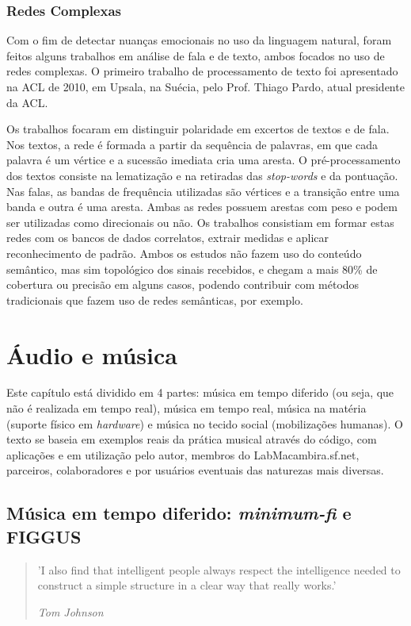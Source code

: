 \subsubsection{Redes Complexas}
Com o fim de detectar nuanças emocionais no uso da linguagem natural, foram feitos alguns trabalhos em análise de fala e de texto, ambos focados no uso de redes complexas. O primeiro trabalho de processamento de texto foi apresentado na ACL de 2010, em Upsala, na Suécia, pelo Prof. Thiago Pardo, atual presidente da ACL.\cite{FabbriACL,FabbriComplenetVoz,FabbriComplenetTexto}

Os trabalhos focaram em distinguir polaridade em excertos de textos e de fala. Nos textos, a rede é formada a partir da sequência de palavras, em que cada palavra é um vértice e a sucessão imediata cria uma aresta. O pré-processamento dos textos consiste na lematização e na retiradas das \emph{stop-words} e da pontuação. Nas falas, as bandas de frequência utilizadas são vértices e a transição entre uma banda e outra é uma aresta. Ambas as redes possuem arestas com peso e podem ser utilizadas como direcionais ou não. Os trabalhos consistiam em formar estas redes com os bancos de dados correlatos, extrair medidas e aplicar reconhecimento de padrão. Ambos os estudos não fazem uso do conteúdo semântico, mas sim topológico dos sinais recebidos, e chegam a mais 80\% de cobertura ou precisão em alguns casos, podendo contribuir com métodos tradicionais que fazem uso de redes semânticas, por exemplo.

\section{Áudio e música}

Este capítulo está dividido em 4 partes: música em
tempo diferido (ou seja, que não é realizada em tempo real), música em
tempo real, música na matéria (suporte físico em \emph{hardware}) e música no
tecido social (mobilizações humanas).
O texto se baseia em exemplos reais da prática musical através do código, com aplicações e em utilização pelo autor, membros do
LabMacambira.sf.net, parceiros, colaboradores e por usuários
eventuais das naturezas mais diversas.


\subsection{Música em tempo diferido: \emph{minimum-fi} e FIGGUS}

\begin{quotation}
\small 'I also find that intelligent people always respect the intelligence needed to construct a simple structure in a clear way that really works.'

\emph{Tom Johnson}
\end{quotation}

